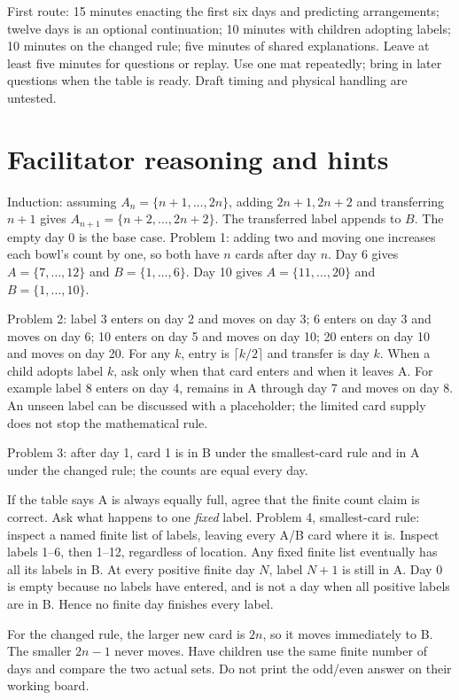 \documentclass[11pt,letterpaper]{article}
\begin{document}
First route: 15 minutes enacting the first six days and predicting arrangements; twelve days is an optional continuation; 10 minutes with children adopting labels; 10 minutes on the changed rule; five minutes of shared explanations. Leave at least five minutes for questions or replay. Use one mat repeatedly; bring in later questions when the table is ready. Draft timing and physical handling are untested.
\newpage
\section*{Facilitator reasoning and hints}
Induction: assuming $A_n=\{n+1,\ldots,2n\}$, adding $2n+1,2n+2$ and transferring $n+1$ gives $A_{n+1}=\{n+2,\ldots,2n+2\}$. The transferred label appends to $B$. The empty day 0 is the base case. Problem 1: adding two and moving one increases each bowl's count by one, so both have $n$ cards after day $n$. Day 6 gives $A=\{7,\ldots,12\}$ and $B=\{1,\ldots,6\}$. Day 10 gives $A=\{11,\ldots,20\}$ and $B=\{1,\ldots,10\}$.

Problem 2: label 3 enters on day 2 and moves on day 3; 6 enters on day 3 and moves on day 6; 10 enters on day 5 and moves on day 10; 20 enters on day 10 and moves on day 20. For any $k$, entry is $\lceil k/2\rceil$ and transfer is day $k$. When a child adopts label $k$, ask only when that card enters and when it leaves A. For example label 8 enters on day 4, remains in A through day 7 and moves on day 8. An unseen label can be discussed with a placeholder; the limited card supply does not stop the mathematical rule.

Problem 3: after day 1, card 1 is in B under the smallest-card rule and in A under the changed rule; the counts are equal every day.

If the table says A is always equally full, agree that the finite count claim is correct. Ask what happens to one \emph{fixed} label. Problem 4, smallest-card rule: inspect a named finite list of labels, leaving every A/B card where it is. Inspect labels 1--6, then 1--12, regardless of location. Any fixed finite list eventually has all its labels in B. At every positive finite day $N$, label $N+1$ is still in A. Day 0 is empty because no labels have entered, and is not a day when all positive labels are in B. Hence no finite day finishes every label.

For the changed rule, the larger new card is $2n$, so it moves immediately to B. The smaller $2n-1$ never moves. Have children use the same finite number of days and compare the two actual sets. Do not print the odd/even answer on their working board.
\newpage
\end{document}
